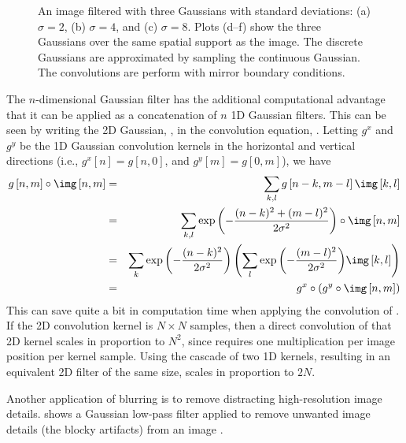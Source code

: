 \begin{figure}[t]
{		%
	}
	\caption{An image filtered with three Gaussians with standard deviations: (a) $\sigma=2$, (b) $\sigma=4$, and (c) $\sigma=8$. Plots (d--f) show the three Gaussians over the same spatial support as the image. The discrete Gaussians are approximated by sampling the continuous Gaussian. The convolutions are perform with mirror boundary conditions. }
	\label{fig:zebragaussian}
\end{figure}





The $n$-dimensional Gaussian filter has the additional computational advantage that it can
be applied as a concatenation of $n$ 1D Gaussian filters.  This can be
seen by writing the 2D Gaussian, \eqn{\ref{eq:gauss2d}}, in the
convolution equation, \eqn{\ref{eq:2dconv}}.  Letting $g^x$
and $g^y$ be the 1D Gaussian convolution kernels in the horizontal
and vertical directions (i.e., $g^x [n]=g[n,0]$, and $g^y[m]=g[0,m]$), we have
\begin{eqnarray*}
	g \left[n,m \right] \circ \img \left[n,m\right]
	& = & \sum_{k,l}
	g \left[n-k,m-l \right] \img \left[k,l \right] \\
	& = & \sum_{k,l}
	\exp{ \left( -\frac{(n-k)^2 + (m-l)^2}{2 \sigma^2} \right) }
	\circ \img \left[n,m \right] \\
	& = &
	\sum_{k}
	\exp{ \left( -\frac{(n-k)^2}{2 \sigma^2} \right) }
	\left(
	\sum_{l}
	\exp{ \left( -\frac{(m-l)^2}{2 \sigma^2} \right) } \img \left[k,l \right]
	\right)
	\\
	& = &
	g^x \circ (g^y \circ \img \left[n,m \right])
	\label{eq:2dgauss}
\end{eqnarray*}
This can save quite a bit in computation time when applying the
convolution of \eqn{\ref{eq:2dgauss}}.  If the 2D convolution kernel
is $N \times N$ samples, then a direct convolution of that 2D kernel scales
in proportion to $N^2$, since \eqn{\ref{eq:2dgauss}} requires one
multiplication per image position per kernel sample.  Using the
cascade of two 1D kernels, resulting in an equivalent 2D filter of
the same size, scales in proportion to $2N$.

Another application of blurring is to remove distracting
high-resolution image details.
\fig{\ref{fig:lincoln}} shows a Gaussian low-pass filter applied to
remove unwanted image details (the blocky artifacts) from an image \cite{Harmon_1973}.

